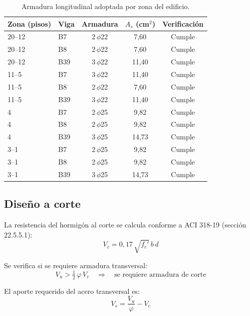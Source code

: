 \begin{table}[H]
\centering
\caption{Armadura longitudinal adoptada por zona del edificio.}
\label{tab:viga_flexion}
\begin{tabular}{llccc}
\hline
Zona (pisos) & Viga & Armadura & $A_s$ (cm$^2$) & Verificación \\
\hline
20--12 & B7  & 2\,\(\phi\)22 & 7,60  & Cumple \\
20--12 & B8  & 2\,\(\phi\)22 & 7,60  & Cumple \\
20--12 & B39 & 3\,\(\phi\)22 & 11,40 & Cumple \\
\hline
11--5  & B7  & 3\,\(\phi\)22 & 11,40 & Cumple \\
11--5  & B8  & 2\,\(\phi\)22 & 7,60  & Cumple \\
11--5  & B39 & 3\,\(\phi\)22 & 11,40 & Cumple \\
\hline
4      & B7  & 2\,\(\phi\)25 & 9,82  & Cumple \\
4      & B8  & 2\,\(\phi\)25 & 9,82  & Cumple \\
4      & B39 & 3\,\(\phi\)25 & 14,73 & Cumple \\
\hline
3--1   & B7  & 2\,\(\phi\)25 & 9,82  & Cumple \\
3--1   & B8  & 2\,\(\phi\)25 & 9,82  & Cumple \\
3--1   & B39 & 3\,\(\phi\)25 & 14,73 & Cumple \\
\hline
\end{tabular}
\end{table}
 
\subsection{Diseño a corte}
 
La resistencia del hormigón al corte se calcula conforme a ACI 318-19 (sección 22.5.5.1):
\begin{equation}
    V_c = 0{,}17\,\sqrt{f_c'}\,b\,d
\end{equation}
 
Se verifica si se requiere armadura transversal:
\begin{equation}
    V_u > \tfrac{1}{2}\,\varphi\,V_c \quad \Rightarrow \quad \text{se requiere armadura de corte}
\end{equation}
 
El aporte requerido del acero transversal es:
\begin{equation}
    V_s = \frac{V_u}{\varphi} - V_c
\end{equation}
 

